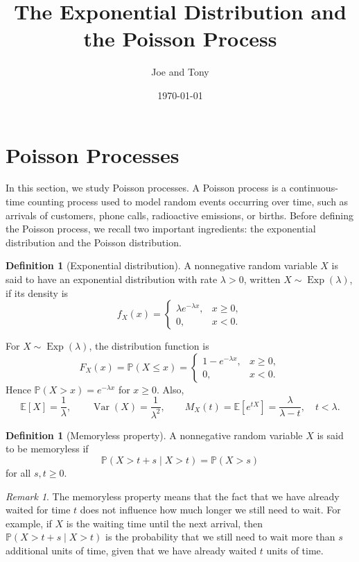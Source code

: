 \documentclass[11pt]{article}
\title{The Exponential Distribution and
	the Poisson Process}
\author{Joe and Tony}
\date{\today}
\theoremstyle{plain}
\theoremstyle{definition}
\newtheorem{definition}[theorem]{Definition}
\theoremstyle{remark}
\newtheorem{remark}[theorem]{Remark}
\begin{document}
	\maketitle
	\tableofcontents

	
\section{Poisson Processes}

In this section, we study Poisson processes. A Poisson process is a continuous-time counting process used to model random events occurring over time, such as arrivals of customers, phone calls, radioactive emissions, or births. Before defining the Poisson process, we recall two important ingredients: the exponential distribution and the Poisson distribution.

\begin{definition}[Exponential distribution]
	A nonnegative random variable \(X\) is said to have an exponential distribution with rate \(\lambda>0\), written \(X\sim \operatorname{Exp}(\lambda)\), if its density is
	\[
	f_X(x)
	=
	\begin{cases}
		\lambda e^{-\lambda x}, & x\ge 0,\\
		0, & x<0.
	\end{cases}
	\]
\end{definition}

For \(X\sim \operatorname{Exp}(\lambda)\), the distribution function is
\[
F_X(x)=\mathbb{P}(X\le x)
=
\begin{cases}
	1-e^{-\lambda x}, & x\ge 0,\\
	0, & x<0.
\end{cases}
\]
Hence \(\mathbb{P}(X>x)=e^{-\lambda x}\) for \(x\ge 0\). Also,
\[
\mathbb{E}[X]=\frac{1}{\lambda},
\qquad
\operatorname{Var}(X)=\frac{1}{\lambda^2},
\qquad
M_X(t)=\mathbb{E}[e^{tX}]=\frac{\lambda}{\lambda-t},\quad t<\lambda.
\]

\begin{definition}[Memoryless property]
	A nonnegative random variable \(X\) is said to be memoryless if
	\[
	\mathbb{P}(X>t+s\mid X>t)=\mathbb{P}(X>s)
	\]
	for all \(s,t\ge 0\).
\end{definition}

\begin{remark}
	The memoryless property means that the fact that we have already waited for time \(t\) does not influence how much longer we still need to wait. For example, if \(X\) is the waiting time until the next arrival, then \(\mathbb{P}(X>t+s\mid X>t)\) is the probability that we still need to wait more than \(s\) additional units of time, given that we have already waited \(t\) units of time.
\end{remark}
\end{document}
